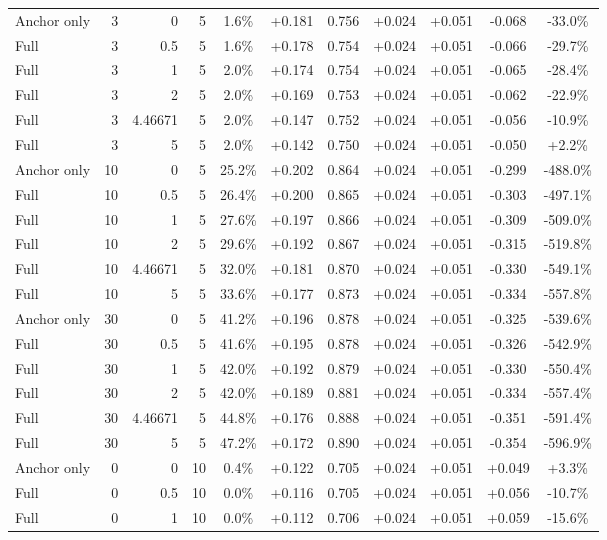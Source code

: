 \begin{table}[htbp]
\begin{tabular}{lrrrccccccc}
Anchor only & 3 & 0 & 5 & 1.6\% & +0.181 & 0.756 & +0.024 & +0.051 & -0.068 & -33.0\% \\
Full & 3 & 0.5 & 5 & 1.6\% & +0.178 & 0.754 & +0.024 & +0.051 & -0.066 & -29.7\% \\
Full & 3 & 1 & 5 & 2.0\% & +0.174 & 0.754 & +0.024 & +0.051 & -0.065 & -28.4\% \\
Full & 3 & 2 & 5 & 2.0\% & +0.169 & 0.753 & +0.024 & +0.051 & -0.062 & -22.9\% \\
Full & 3 & 4.46671 & 5 & 2.0\% & +0.147 & 0.752 & +0.024 & +0.051 & -0.056 & -10.9\% \\
Full & 3 & 5 & 5 & 2.0\% & +0.142 & 0.750 & +0.024 & +0.051 & -0.050 & +2.2\% \\
Anchor only & 10 & 0 & 5 & 25.2\% & +0.202 & 0.864 & +0.024 & +0.051 & -0.299 & -488.0\% \\
Full & 10 & 0.5 & 5 & 26.4\% & +0.200 & 0.865 & +0.024 & +0.051 & -0.303 & -497.1\% \\
Full & 10 & 1 & 5 & 27.6\% & +0.197 & 0.866 & +0.024 & +0.051 & -0.309 & -509.0\% \\
Full & 10 & 2 & 5 & 29.6\% & +0.192 & 0.867 & +0.024 & +0.051 & -0.315 & -519.8\% \\
Full & 10 & 4.46671 & 5 & 32.0\% & +0.181 & 0.870 & +0.024 & +0.051 & -0.330 & -549.1\% \\
Full & 10 & 5 & 5 & 33.6\% & +0.177 & 0.873 & +0.024 & +0.051 & -0.334 & -557.8\% \\
Anchor only & 30 & 0 & 5 & 41.2\% & +0.196 & 0.878 & +0.024 & +0.051 & -0.325 & -539.6\% \\
Full & 30 & 0.5 & 5 & 41.6\% & +0.195 & 0.878 & +0.024 & +0.051 & -0.326 & -542.9\% \\
Full & 30 & 1 & 5 & 42.0\% & +0.192 & 0.879 & +0.024 & +0.051 & -0.330 & -550.4\% \\
Full & 30 & 2 & 5 & 42.0\% & +0.189 & 0.881 & +0.024 & +0.051 & -0.334 & -557.4\% \\
Full & 30 & 4.46671 & 5 & 44.8\% & +0.176 & 0.888 & +0.024 & +0.051 & -0.351 & -591.4\% \\
Full & 30 & 5 & 5 & 47.2\% & +0.172 & 0.890 & +0.024 & +0.051 & -0.354 & -596.9\% \\
Anchor only & 0 & 0 & 10 & 0.4\% & +0.122 & 0.705 & +0.024 & +0.051 & +0.049 & +3.3\% \\
Full & 0 & 0.5 & 10 & 0.0\% & +0.116 & 0.705 & +0.024 & +0.051 & +0.056 & -10.7\% \\
Full & 0 & 1 & 10 & 0.0\% & +0.112 & 0.706 & +0.024 & +0.051 & +0.059 & -15.6\% \\

\end{tabular}
\end{table}
